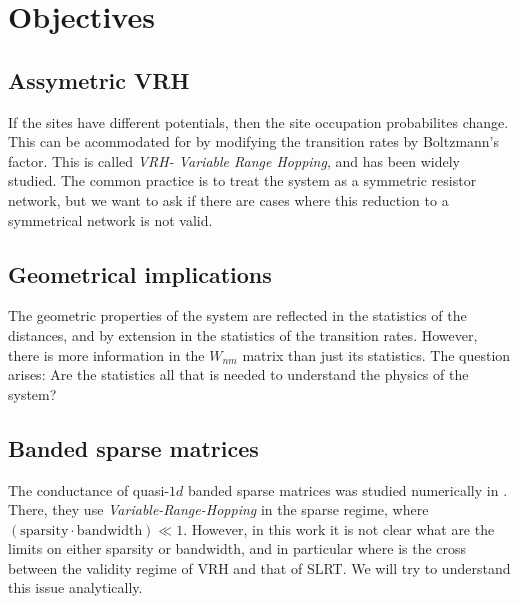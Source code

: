 \chapter{Objectives}

\section{Assymetric VRH}

If the sites have different potentials, then the site occupation probabilites change. This can be acommodated for by modifying the transition rates by Boltzmann's factor. This is called \emph{VRH- Variable Range Hopping}\cite{ambegaokar_hopping_1971}, and has been widely studied. The common practice is to treat the system as a symmetric resistor network, but we want to ask if there are cases where this reduction to a symmetrical network is not valid.





\section{Geometrical implications}

The geometric properties of the system are reflected in the statistics of the distances, and by extension in the statistics of the transition rates. However, there is more information in the $W_{nm}$ matrix than just its statistics. The question arises: Are the statistics all that is needed to understand the physics of the system? 

\section{Banded sparse matrices}

The conductance of quasi-$1d$ banded sparse matrices was studied numerically in \cite{Stotland_random-matrix_2010,janssen_correlated_2000}. There, they use \emph{Variable-Range-Hopping} in the sparse regime, where 
$(\text{sparsity}\cdot \text{bandwidth}) \ll 1$. However, in this work it is not clear what are the limits on either sparsity or bandwidth, and in particular where is the cross between the validity regime of VRH and that of SLRT. We will try to understand this issue analytically.

